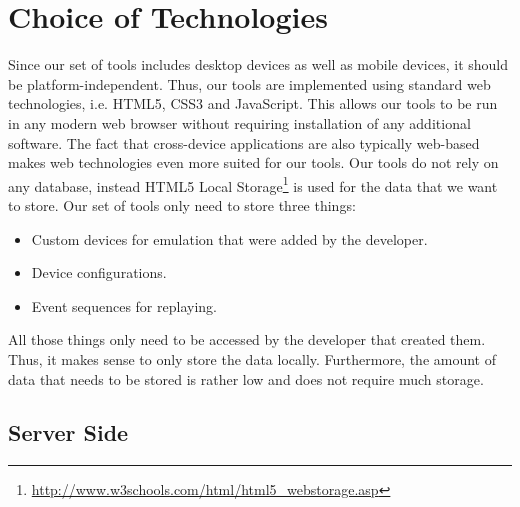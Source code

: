 \section{Choice of Technologies}

Since our set of tools includes desktop devices as well as mobile devices, it should be platform-independent. Thus, our tools are implemented using standard web technologies, i.e. HTML5, CSS3 and JavaScript. This allows our tools to be run in any modern web browser without requiring installation of any additional software. The fact that cross-device applications are also typically web-based makes web technologies even more suited for our tools. Our tools do not rely on any database, instead HTML5 Local Storage\footnote{\url{http://www.w3schools.com/html/html5_webstorage.asp}} is used for the data that we want to store. Our set of tools only need to store three things:
\begin{itemize}
	\item Custom devices for emulation that were added by the developer.
	\item Device configurations.
	\item Event sequences for replaying.
\end{itemize}
All those things only need to be accessed by the developer that created them. Thus, it makes sense to only store the data locally. Furthermore, the amount of data that needs to be stored is rather low and does not require much storage. 

\subsection{Server Side}

